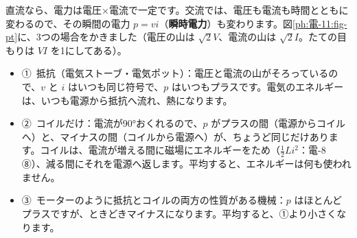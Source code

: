 \label{ph:電-11:sec2}
直流なら、電力は電圧×電流で一定です。交流では、電圧も電流も時間とともに変わるので、その瞬間の電力 $p=vi$（\textbf{瞬時電力}）も変わります。図\ref{ph:電-11:fig-pt}に、3つの場合をかきました（電圧の山は $\sqrt2V$、電流の山は $\sqrt2I$。たての目もりは $VI$ を1にしてある）。

\begin{itemize}[leftmargin=1.2\zw, itemsep=1pt, topsep=2pt, label={\color{\bkTT}●}]
\item ①\ 抵抗（電気ストーブ・電気ポット）：電圧と電流の山がそろっているので、$v$ と $i$ はいつも同じ符号で、$p$ はいつもプラスです。電気のエネルギーは、いつも電源から抵抗へ流れ、熱になります。
\item ②\ コイルだけ：電流が90°おくれるので、$p$ がプラスの間（電源からコイルへ）と、マイナスの間（コイルから電源へ）が、ちょうど同じだけあります。コイルは、電流が増える間に磁場にエネルギーをため（$\tfrac12Li^2$：電-8 ⑧）、減る間にそれを電源へ返します。平均すると、エネルギーは何も使われません。
\item ③\ モーターのように抵抗とコイルの両方の性質がある機械：$p$ はほとんどプラスですが、ときどきマイナスになります。平均すると、①より小さくなります。
\end{itemize}

